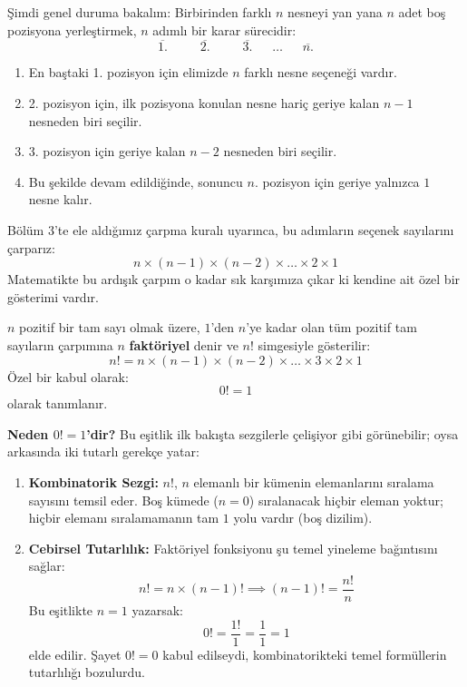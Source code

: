 Şimdi genel duruma bakalım: Birbirinden farklı $n$ nesneyi yan yana $n$ adet boş pozisyona yerleştirmek, $n$ adımlı bir karar sürecidir:
\[ \overline{\quad 1. \quad} \;\; \overline{\quad 2. \quad} \;\; \overline{\quad 3. \quad} \;\; \dots \;\; \overline{\quad n. \quad} \]
\begin{enumerate}
  \item En baştaki 1. pozisyon için elimizde $n$ farklı nesne seçeneği vardır.
  \item 2. pozisyon için, ilk pozisyona konulan nesne hariç geriye kalan $n-1$ nesneden biri seçilir.
  \item 3. pozisyon için geriye kalan $n-2$ nesneden biri seçilir.
  \item Bu şekilde devam edildiğinde, sonuncu $n$. pozisyon için geriye yalnızca $1$ nesne kalır.
\end{enumerate}

Bölüm 3'te ele aldığımız çarpma kuralı uyarınca, bu adımların seçenek sayılarını çarparız:
\[ n \times (n-1) \times (n-2) \times \dots \times 2 \times 1 \]
Matematikte bu ardışık çarpım o kadar sık karşımıza çıkar ki kendine ait özel bir gösterimi vardır.

\begin{definition}[Faktöriyel]
$n$ pozitif bir tam sayı olmak üzere, $1$'den $n$'ye kadar olan tüm pozitif tam sayıların çarpımına $n$ \textbf{faktöriyel} denir ve $n!$ simgesiyle gösterilir:
\[ n! = n \times (n-1) \times (n-2) \times \dots \times 3 \times 2 \times 1 \]
Özel bir kabul olarak:
\[ 0! = 1 \]
olarak tanımlanır.
\end{definition}

\textbf{Neden $0! = 1$'dir?} Bu eşitlik ilk bakışta sezgilerle çelişiyor gibi görünebilir; oysa arkasında iki tutarlı gerekçe yatar:
\begin{enumerate}
  \item \textbf{Kombinatorik Sezgi:} $n!$, $n$ elemanlı bir kümenin elemanlarını sıralama sayısını temsil eder. Boş kümede ($n=0$) sıralanacak hiçbir eleman yoktur; hiçbir elemanı sıralamamanın tam $1$ yolu vardır (boş dizilim).
  \item \textbf{Cebirsel Tutarlılık:} Faktöriyel fonksiyonu şu temel yineleme bağıntısını sağlar:
  \[ n! = n \times (n-1)! \implies (n-1)! = \frac{n!}{n} \]
  Bu eşitlikte $n = 1$ yazarsak:
  \[ 0! = \frac{1!}{1} = \frac{1}{1} = 1 \]
  elde edilir. Şayet $0! = 0$ kabul edilseydi, kombinatorikteki temel formüllerin tutarlılığı bozulurdu.
\end{enumerate}

